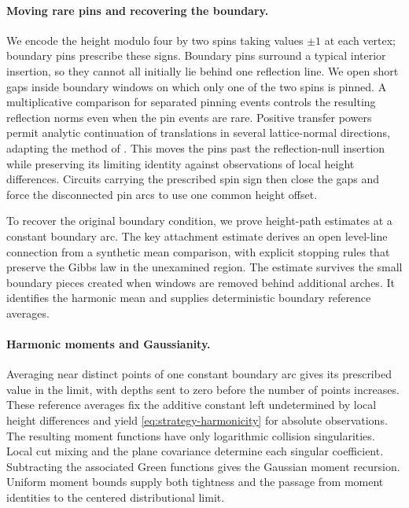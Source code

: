 \paragraph{Moving rare pins and recovering the boundary.}
We encode the height modulo four by two spins taking values $\pm1$ at each vertex;
boundary pins prescribe these signs.
Boundary pins surround a typical interior insertion, so they cannot all
initially lie behind one reflection line.  We open short gaps inside
boundary windows on which only one of the two spins is pinned.
A multiplicative comparison for separated pinning
events controls the resulting reflection norms even when the pin events
are rare.  Positive transfer powers permit analytic continuation of
translations in several lattice-normal directions, adapting the method of
\cite[Section~7.1]{DCKLM2026}.  This moves the pins
past the reflection-null insertion while preserving its limiting identity
against observations of local height differences.
Circuits carrying the prescribed spin sign then close the gaps and force
the disconnected pin arcs to use one common height offset.

To recover the original boundary condition, we prove height-path estimates
at a constant boundary arc.  The key attachment estimate derives an open
level-line connection from a synthetic mean comparison, with explicit
stopping rules that preserve the Gibbs law in the unexamined region.
The estimate survives the small boundary pieces created when windows are
removed behind additional arches.  It identifies the harmonic mean and supplies deterministic
boundary reference averages.

\paragraph{Harmonic moments and Gaussianity.}
Averaging near distinct points of one constant boundary arc gives its
prescribed value in the limit, with depths sent to zero before the number
of points increases.  These reference averages fix the additive constant left
undetermined by local height differences and yield
\eqref{eq:strategy-harmonicity} for absolute observations.
The resulting moment functions have only logarithmic collision singularities.
Local cut mixing and the plane
covariance determine each singular coefficient.  Subtracting the associated
Green functions gives the Gaussian moment recursion.  Uniform moment
bounds supply both tightness and the passage from moment identities to the
centered distributional limit.

